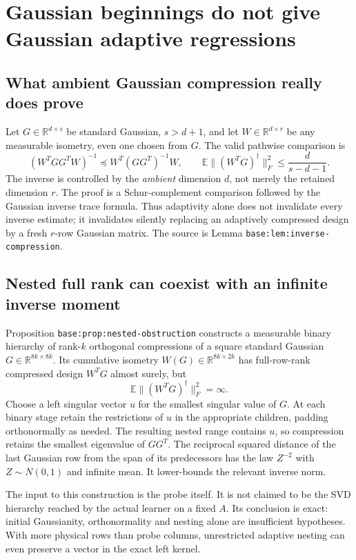 \documentclass[11pt,oneside,openany,a4paper]{report}
\numberwithin{equation}{chapter}
\theoremstyle{definition}
\theoremstyle{remark}
\begin{document}
\section{Gaussian beginnings do not give Gaussian adaptive regressions}
\label{origobs:adaptive-inverses}

\subsection{What ambient Gaussian compression really does prove}

Let $G\in\mathbb R^{d\times s}$ be standard Gaussian, $s>d+1$, and let
$W\in\mathbb R^{d\times r}$ be any measurable isometry, even one chosen
from $G$.  The valid pathwise comparison is
\[
 (W^TGG^TW)^{-1}\preceq W^T(GG^T)^{-1}W,
 \qquad
 \mathbb E\|(W^TG)^\dagger\|_F^2\le\frac{d}{s-d-1}.
\]
The inverse is controlled by the \emph{ambient} dimension $d$, not merely
the retained dimension $r$.  The proof is a Schur-complement comparison
followed by the Gaussian inverse trace formula.  Thus adaptivity alone
does not invalidate every inverse estimate; it invalidates silently
replacing an adaptively compressed design by a fresh $r$-row Gaussian
matrix.  The source is Lemma \texttt{base:lem:inverse-compression}.

\subsection{Nested full rank can coexist with an infinite inverse moment}

Proposition \texttt{base:prop:nested-obstruction} constructs a measurable
binary hierarchy of rank-$k$ orthogonal compressions of a square standard
Gaussian $G\in\mathbb R^{8k\times8k}$.  Its cumulative isometry
$W(G)\in\mathbb R^{8k\times2k}$ has full-row-rank compressed design
$W^TG$ almost surely, but
\[
 \mathbb E\|(W^TG)^\dagger\|_F^2=\infty.
\]
Choose a left singular vector $u$ for the smallest singular value of $G$.
At each binary stage retain the restrictions of $u$ in the appropriate
children, padding orthonormally as needed.  The resulting nested range
contains $u$, so compression retains the smallest eigenvalue of $GG^T$.
The reciprocal squared distance of the last Gaussian row from the span
of its predecessors has the law $Z^{-2}$ with $Z\sim N(0,1)$ and infinite
mean.  It lower-bounds the relevant inverse norm.

The input to this construction is the probe itself.  It is not claimed
to be the SVD hierarchy reached by the actual learner on a fixed $A$.
Its conclusion is exact: initial Gaussianity, orthonormality and nesting
alone are insufficient hypotheses.  With more physical rows than probe
columns, unrestricted adaptive nesting can even preserve a vector in
the exact left kernel.
\end{document}
